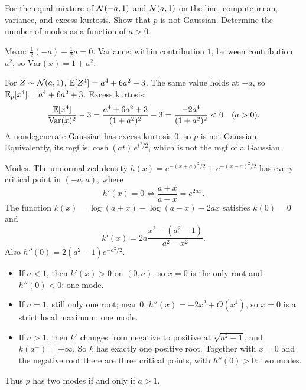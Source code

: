 \begin{hwqbox}
For the equal mixture of $\mathcal{N}(-a,1)$ and $\mathcal{N}(a,1)$ on the line, compute mean, variance, and excess kurtosis. Show that $p$ is not Gaussian. Determine the number of modes as a function of $a>0$.
\end{hwqbox}
\begin{hwsolbox}
Mean: $\tfrac12(-a)+\tfrac12 a=0$. Variance: within contribution $1$, between contribution $a^2$, so $\mathrm{Var}(x)=1+a^2$.

For $Z\sim\mathcal{N}(a,1)$, $\mathbb{E}[Z^4]=a^4+6a^2+3$. The same value holds at $-a$, so $\mathbb{E}_p[x^4]=a^4+6a^2+3$. Excess kurtosis:
\[
\frac{\mathbb{E}[x^4]}{\mathrm{Var}(x)^2}-3
=\frac{a^4+6a^2+3}{(1+a^2)^2}-3
=\frac{-2a^4}{(1+a^2)^2}<0
\quad(a>0).
\]
A nondegenerate Gaussian has excess kurtosis $0$, so $p$ is not Gaussian. Equivalently, its mgf is $\cosh(at)\,e^{t^2/2}$, which is not the mgf of a Gaussian.

Modes. The unnormalized density $h(x)=e^{-(x+a)^2/2}+e^{-(x-a)^2/2}$ has every critical point in $(-a,a)$, where
\[
h'(x)=0\iff \frac{a+x}{a-x}=e^{2ax}.
\]
The function $k(x)=\log(a+x)-\log(a-x)-2ax$ satisfies $k(0)=0$ and
\[
k'(x)=2a\frac{x^2-(a^2-1)}{a^2-x^2}.
\]
Also $h''(0)=2(a^2-1)e^{-a^2/2}$.
\begin{itemize}
\item If $a<1$, then $k'(x)>0$ on $(0,a)$, so $x=0$ is the only root and $h''(0)<0$: one mode.
\item If $a=1$, still only one root; near $0$, $h''(x)=-2x^2+O(x^4)$, so $x=0$ is a strict local maximum: one mode.
\item If $a>1$, then $k'$ changes from negative to positive at $\sqrt{a^2-1}$, and $k(a^-)=+\infty$. So $k$ has exactly one positive root. Together with $x=0$ and the negative root there are three critical points, with $h''(0)>0$: two modes.
\end{itemize}
Thus $p$ has two modes if and only if $a>1$.
\end{hwsolbox}

